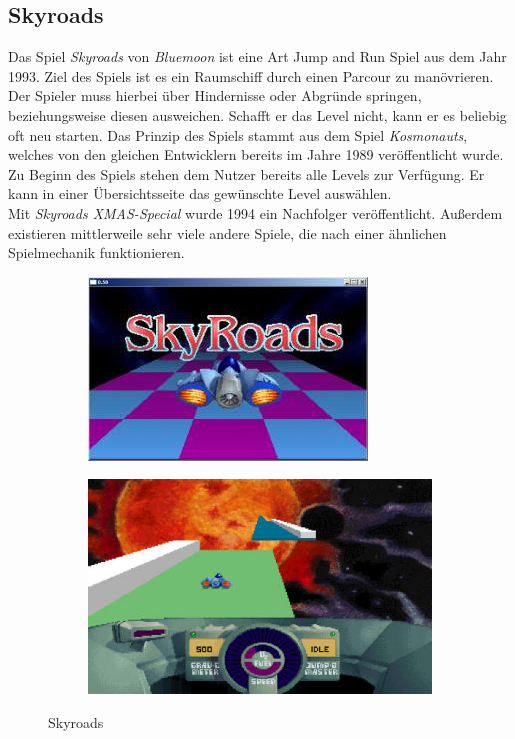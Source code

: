 \subsection{Skyroads}
Das Spiel \textit{Skyroads} von \textit{Bluemoon} ist eine Art Jump and Run Spiel aus dem Jahr 1993. Ziel des Spiels ist es ein Raumschiff durch einen Parcour zu manövrieren. Der Spieler muss hierbei über Hindernisse oder Abgründe springen, beziehungsweise diesen ausweichen. Schafft er das Level nicht, kann er es beliebig oft neu starten. Das Prinzip des Spiels stammt aus dem Spiel \textit{Kosmonauts}, welches von den gleichen Entwicklern bereits im Jahre 1989 veröffentlicht wurde. Zu Beginn des Spiels stehen dem Nutzer bereits alle Levels zur Verfügung. Er kann in einer Übersichtsseite das gewünschte Level auswählen. \\
Mit \textit{Skyroads XMAS-Special} wurde 1994 ein Nachfolger veröffentlicht. Außerdem existieren mittlerweile sehr viele andere Spiele, die nach einer ähnlichen Spielmechanik funktionieren.
\begin{figure}[ht]
	\centering
	\begin{subfigure}{.45\textwidth}
	\centering
			\includegraphics[width=.9\textwidth]{gfx/recherche/skyroads1.jpg}
	\end{subfigure}
	\begin{subfigure}{.45\textwidth}
	\centering
			\includegraphics[width=.9\textwidth]{gfx/recherche/skyroads2.jpg}  
	\end{subfigure}
	\caption{Skyroads}
\end{figure}\\


